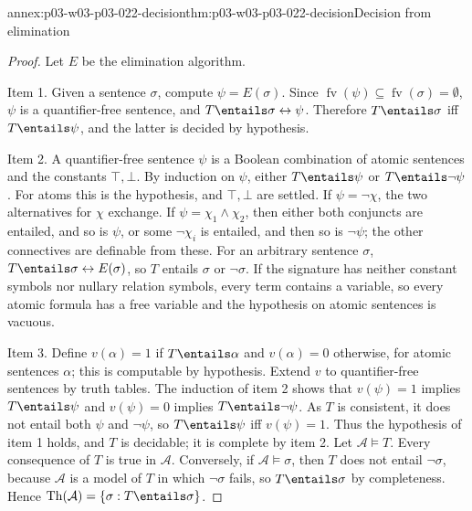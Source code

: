 \begin{annexitem}{annex:p03-w03-p03-022-decision}{thm:p03-w03-p03-022-decision}{Decision from elimination}
\begin{proof}
Let \(E\) be the elimination algorithm.

Item 1. Given a sentence \(\sigma\), compute \(\psi=E(\sigma)\). Since
\(\operatorname{fv}(\psi)\subseteq\operatorname{fv}(\sigma)=\emptyset\), \(\psi\)
is a quantifier-free sentence, and \(T\entails\sigma\leftrightarrow\psi\).
Therefore \(T\entails\sigma\) iff \(T\entails\psi\), and the latter is
decided by hypothesis.

Item 2. A quantifier-free sentence \(\psi\) is a Boolean combination of
atomic sentences and the constants \(\top,\bot\). By induction on \(\psi\),
either \(T\entails\psi\) or \(T\entails\neg\psi\). For atoms this is the
hypothesis, and \(\top,\bot\) are settled. If \(\psi=\neg\chi\), the two
alternatives for \(\chi\) exchange. If \(\psi=\chi_1\land\chi_2\), then
either both conjuncts are entailed, and so is \(\psi\), or some
\(\neg\chi_i\) is entailed, and then so is \(\neg\psi\); the other
connectives are definable from these. For an arbitrary sentence
\(\sigma\), \(T\entails\sigma\leftrightarrow E(\sigma)\), so \(T\) entails
\(\sigma\) or \(\neg\sigma\). If the signature has neither constant
symbols nor nullary relation symbols, every term contains a variable, so
every atomic formula has a free variable and the hypothesis on atomic
sentences is vacuous.

Item 3. Define \(v(\alpha)=1\) if \(T\entails\alpha\) and \(v(\alpha)=0\)
otherwise, for atomic sentences \(\alpha\); this is computable by
hypothesis. Extend \(v\) to quantifier-free sentences by truth tables. The
induction of item 2 shows that \(v(\psi)=1\) implies \(T\entails\psi\) and
\(v(\psi)=0\) implies \(T\entails\neg\psi\). As \(T\) is consistent, it
does not entail both \(\psi\) and \(\neg\psi\), so \(T\entails\psi\) iff
\(v(\psi)=1\). Thus the hypothesis of item 1 holds, and \(T\) is decidable;
it is complete by item 2. Let \(\mathcal A\models T\). Every consequence of
\(T\) is true in \(\mathcal A\). Conversely, if \(\mathcal A\models\sigma\),
then \(T\) does not entail \(\neg\sigma\), because \(\mathcal A\) is a model of \(T\) in
which \(\neg\sigma\) fails, so \(T\entails\sigma\) by completeness. Hence
\(\operatorname{Th}(\mathcal A)=\{\sigma:T\entails\sigma\}\).
\end{proof}
\end{annexitem}

